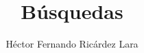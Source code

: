 \documentclass[a4paper,12pt]{book}
\begin{document}
\author{Héctor Fernando Ricárdez Lara}
\title{Búsquedas}
\date{}

\frontmatter
\maketitle

\renewcommand{\contentsname}{Índice}
\tableofcontents

\mainmatter







\backmatter
\end{document}
